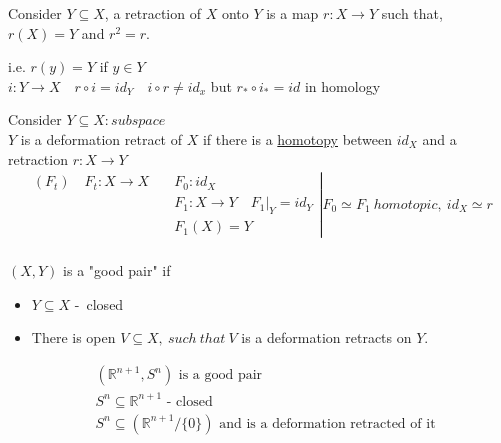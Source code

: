 \documentclass[11pt,a4paper]{report}
\begin{document}
                \begin{defn}[Retraction]
                  Consider $Y \subseteq X $, a retraction of $X$ onto $Y$ is a map $r: X \rightarrow Y$ such that, $ r(X) = Y$ and $r^2 = r$.\\
                \end{defn}
                  i.e. $r(y) = Y$ if $y \in Y$\\
                  $i: Y \rightarrow X \quad r \circ i = id_Y \quad i \circ r \ne id_x$
                  but $r_* \circ i_* = id$ in homology\\

                \begin{defn} 
                  Consider $Y \subseteq X: subspace$\\
                  $Y$ is a deformation retract of $X$ if there is a \underline{homotopy} between $id_X$ and a retraction $r: X \rightarrow Y$\\
                  \begin{align*}
                    \left.
                    \begin{array}{cl}
                      (F_t) \quad F_t: X \rightarrow X \quad &F_0: id_X\\
                                           &F_1: X \rightarrow Y \quad F_1|_Y = id_Y\\
                                           &F_1(X) = Y
                    \end{array}
                                             \right| F_0 \simeq F_1\ homotopic,\ id_X \simeq r\\
                  \end{align*}
                \end{defn}
                $(X, Y)$ is a "good pair" if
                \begin{itemize}
                \item $Y \subseteq X$ -\ closed
                \item There is open $V \subseteq X,\ such \ that \ V$ is a deformation retracts on $Y$.
                \end{itemize}

                \begin{Ex}
                \begin{align*}
                  &(\mathbb{R}^{n+1}, S^n) \textrm{ is a good pair}\\
                  &S^n \subseteq \mathbb{R}^{n+1} \textrm{ - closed}\\
                  &S^n \subseteq (\mathbb{R}^{n+1} / \{0\}) \textrm{ and is a deformation retracted of it}
                \end{align*}
                \end{Ex}
\end{document}
